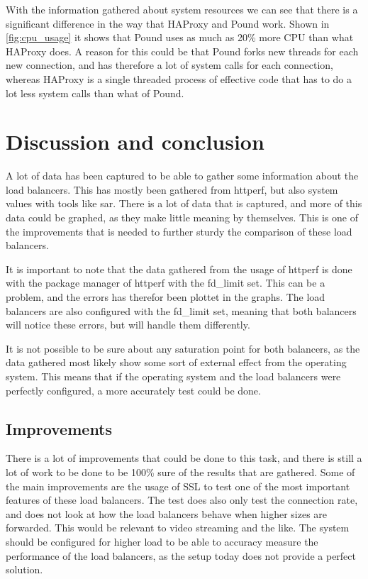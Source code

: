  With the information gathered about system resources we can see that there is
 a significant difference in the way that HAProxy and Pound work. Shown in
 \vref{fig:cpu_usage} it shows that Pound uses as much as 20\% more CPU than
 what HAProxy does.
 A reason for this could be that Pound forks new threads for each new
 connection, and has therefore a lot of system calls for each connection,
 whereas HAProxy is a single threaded process of effective code that has to do
 a lot less system calls than what of Pound.

\section{Discussion and conclusion}
A lot of data has been captured to be able to gather some information about the
load balancers. This has mostly been gathered from httperf, but also system
values with tools like sar. There is a lot of data that is captured, and more
of this data could be graphed, as they make little meaning by themselves. This
is one of the improvements that is needed to further sturdy the comparison of
these load balancers.

It is important to note that the data gathered from the usage of httperf is
done with the package manager of httperf with the fd\_limit set. This can be a
problem, and the errors has therefor been plottet in the graphs. The load
balancers are also configured with the fd\_limit set, meaning that both
balancers will notice these errors, but will handle them differently.

 It is not possible to be sure about any saturation point for both balancers,
 as the data gathered most likely show some sort of external effect from the
 operating system. This means that if the operating system and the load
 balancers were perfectly configured, a more accurately test could be done.


\subsection{Improvements}

There is a lot of improvements that could be done to this task, and there is
still a lot of work to be done to be 100\% sure of the results that are
gathered. Some of the main improvements are the usage of SSL to test one of the
most important features of these load balancers. The test does also only test
the connection rate, and does not look at how the load balancers behave when
higher sizes are forwarded. This would be relevant to video streaming and the
like. The system should be configured for higher load to be able to accuracy
measure the performance of the load balancers, as the setup today does not
provide a perfect solution. 

